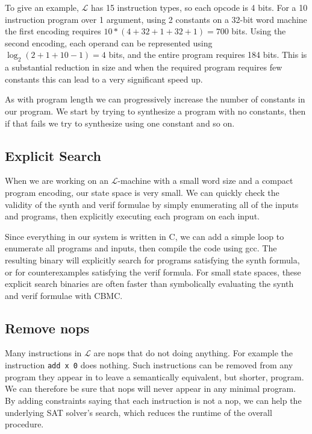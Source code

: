 \documentclass[a4paper]{llncs}
\begin{document}
To give an example, $\mathcal{L}$ has 15 instruction types, so each opcode is 4 bits.
For a 10 instruction program over 1 argument, using 2 constants on a 32-bit word
machine the first encoding requires $10 * (4 + 32 + 1 + 32 + 1) = 700$ bits.
Using the second encoding, each operand can be represented using
$\log_2 (2 + 1 + 10 - 1) = 4$ bits, and the entire program requires 184 bits.
This is a substantial reduction in size and when the required program requires
few constants this can lead to a very significant speed up.

As with program length we can progressively increase the number of constants in
our program.  We start by trying to synthesize a program with no constants, then
if that fails we try to synthesize using one constant and so on.

\subsection{Explicit Search}

When we are working on an $\mathcal{L}$-machine with a small word size and
a compact program encoding, our state space is very small.
We can quickly check the validity of the {\sc synth} and {\sc verif} formulae
by simply enumerating all of the inputs and programs, then explicitly
executing each program on each input.

Since everything in our system is written in C, we can add a simple loop
to enumerate all programs and inputs, then compile the code using {\sc gcc}.
The resulting binary will explicitly search for programs satisfying the {\sc synth}
formula, or for counterexamples satisfying the {\sc verif} formula.
For small state spaces, these explicit search binaries are often faster
than symbolically evaluating the {\sc synth} and {\sc verif} formulae with
{\sc CBMC}.

\subsection{Remove nops}
Many instructions in $\mathcal{L}$ are nops that do not doing anything.
For example the instruction \verb|add x 0| does nothing.  Such instructions
can be removed from any program they appear in to leave a semantically
equivalent, but shorter, program.  We can therefore be sure that nops
will never appear in any minimal program.  By adding constraints saying that
each instruction is not a nop, we can help the underlying SAT solver's
search, which reduces the runtime of the overall procedure.
\end{document}
